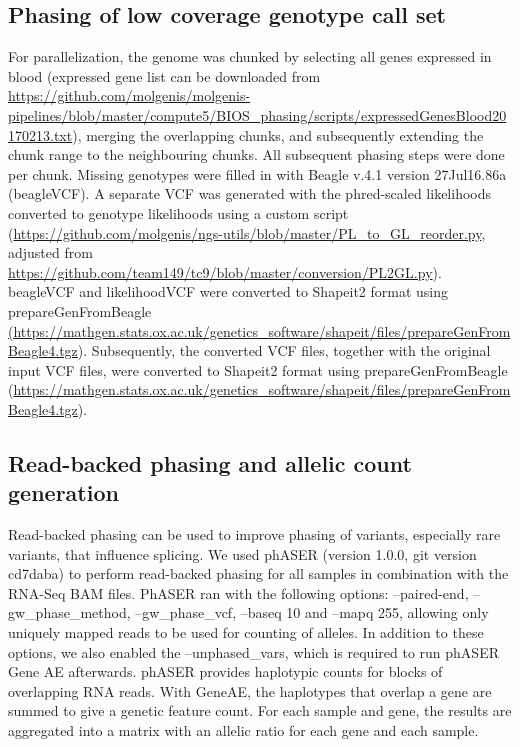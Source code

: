 \subsection{Phasing of low coverage genotype call set}
For parallelization, the genome was chunked by selecting all genes expressed in blood (expressed gene list can be downloaded from \url{https://github.com/molgenis/molgenis-pipelines/blob/master/compute5/BIOS\_phasing/scripts/expressedGenesBlood20170213.txt}), merging the overlapping chunks, and subsequently extending the chunk range to the neighbouring chunks. All subsequent phasing steps were done per chunk. Missing genotypes were filled in with Beagle\cite{browningGenotypeImputationMillions2016} v.4.1 version 27Jul16.86a (beagleVCF). A separate VCF was generated with the phred-scaled likelihoods converted to genotype likelihoods using a custom script (\url{https://github.com/molgenis/ngs-utils/blob/master/PL\_to\_GL\_reorder.py}, adjusted from \url{https://github.com/team149/tc9/blob/master/conversion/PL2GL.py}). beagleVCF and likelihoodVCF were converted to Shapeit2 format using prepareGenFromBeagle \url{(https://mathgen.stats.ox.ac.uk/genetics\_software/shapeit/files/prepareGenFromBeagle4.tgz}). Subsequently, the converted VCF files, together with the original input VCF files, were converted to Shapeit2 format using prepareGenFromBeagle (\url{https://mathgen.stats.ox.ac.uk/genetics\_software/shapeit/files/prepareGenFromBeagle4.tgz}).
	
\subsection{Read-backed phasing and allelic count generation}
Read-backed phasing can be used to improve phasing of variants, especially rare variants, that influence splicing. We used phASER\cite{castelRareVariantPhasing2016} (version 1.0.0, git version cd7daba) to perform read-backed phasing for all samples in combination with the RNA-Seq BAM files. PhASER ran with the following options: --paired-end, --gw\_phase\_method, --gw\_phase\_vcf, --baseq 10 and --mapq 255, allowing only uniquely mapped reads to be used for counting of alleles. In addition to these options, we also enabled the --unphased\_vars, which is required to run phASER Gene AE afterwards.
phASER provides haplotypic counts for blocks of overlapping RNA reads. With GeneAE, the haplotypes that overlap a gene are summed to give a genetic feature count. For each sample and gene, the results are aggregated into a matrix with an allelic ratio for each gene and each sample. 

